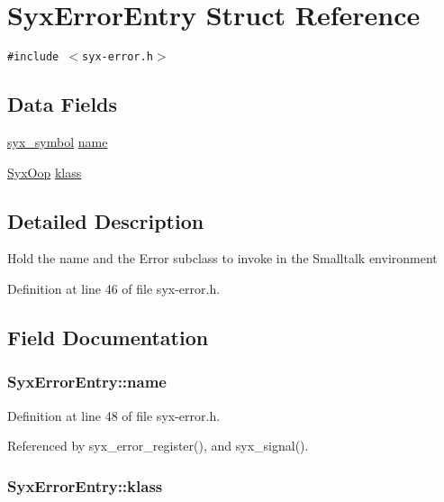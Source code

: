 \hypertarget{struct_syx_error_entry}{
\section{SyxErrorEntry Struct Reference}
\label{struct_syx_error_entry}
}
{\tt \#include $<$syx-error.h$>$}

\subsection*{Data Fields}
\begin{CompactItemize}
\item 
\hyperlink{syx-types_8h_9663af54b7b72f5d8be5f754ef356525}{syx\_\-symbol} \hyperlink{struct_syx_error_entry_eb4ec14186b3f633afa8dbd1719050cd}{name}
\item 
\hyperlink{syx-types_8h_1121caba2d40b2ce090b640762744ccd}{SyxOop} \hyperlink{struct_syx_error_entry_d33ddd6ec297c2055ddb62b8bf04de9f}{klass}
\end{CompactItemize}


\subsection{Detailed Description}
Hold the name and the Error subclass to invoke in the Smalltalk environment 

Definition at line 46 of file syx-error.h.

\subsection{Field Documentation}
\hypertarget{struct_syx_error_entry_eb4ec14186b3f633afa8dbd1719050cd}{
\subsubsection{ {\bf SyxErrorEntry::name}}}
\label{struct_syx_error_entry_eb4ec14186b3f633afa8dbd1719050cd}




Definition at line 48 of file syx-error.h.

Referenced by syx\_\-error\_\-register(), and syx\_\-signal().\hypertarget{struct_syx_error_entry_d33ddd6ec297c2055ddb62b8bf04de9f}{
\subsubsection{ {\bf SyxErrorEntry::klass}}}
\label{struct_syx_error_entry_d33ddd6ec297c2055ddb62b8bf04de9f}




